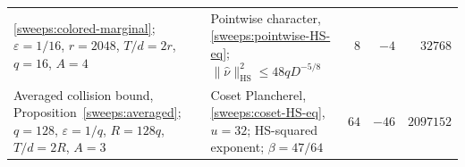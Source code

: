 \documentclass{article}
\newcommand{\phantomsection}{}
\begin{document}
\begin{longtable}{@{}p{.33\linewidth}p{.29\linewidth}r r r@{}}
\eqref{sweeps:colored-marginal};\newline
$\varepsilon=1/16$, $r=2048$,\newline
$T/d=2r$, $q=16$, $A=4$
&
Pointwise character,\newline
\eqref{sweeps:pointwise-HS-eq};\newline
$\|\widehat\nu\|_{\mathrm{HS}}^2\le48qD^{-5/8}$
& $8$ & $-4$ & $32768$\\
\phantomsection\label{sweeps:assembly-collision-HS}
Averaged collision bound,\newline
Proposition~\ref{sweeps:averaged};\newline
$q=128$, $\varepsilon=1/q$, $R=128q$,\newline
$T/d=2R$, $A=3$
&
Coset Plancherel,\newline
\eqref{sweeps:coset-HS-eq}, $u=32$;\newline
HS-squared exponent;\newline
$\beta=47/64$
& $64$ & $-46$ & $2097152$\\
\end{longtable}
\endgroup
\end{document}

